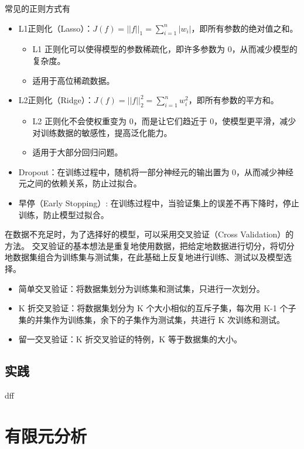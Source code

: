 \documentclass[12pt]{article}
\begin{document}
常见的正则方式有
\begin{itemize}
    \item L1正则化（Lasso）：$J(f) = ||f||_1 = \sum_{i=1}^{n} |w_i|$，即所有参数的绝对值之和。
        \begin{itemize}
            \item L1 正则化可以使得模型的参数稀疏化，即许多参数为 0，从而减少模型的复杂度。
            \item 适用于高位稀疏数据。
        \end{itemize}
    \item L2正则化（Ridge）：$J(f) = ||f||_2^2 = \sum_{i=1}^{n} w_i^2$，即所有参数的平方和。
        \begin{itemize}
            \item L2 正则化不会使权重变为 0，而是让它们趋近于 0，使模型更平滑，减少对训练数据的敏感性，提高泛化能力。
            \item 适用于大部分回归问题。
        \end{itemize}
    \item Dropout：在训练过程中，随机将一部分神经元的输出置为 0，从而减少神经元之间的依赖关系，防止过拟合。
    \item 早停（Early Stopping）: 在训练过程中，当验证集上的误差不再下降时，停止训练，防止模型过拟合。
\end{itemize}
在数据不充足时，为了选择好的模型，可以采用交叉验证（Cross Validation）的方法。
交叉验证的基本想法是重复地使用数据，把给定地数据进行切分，将切分地数据集组合为训练集与测试集，在此基础上反复地进行训练、测试以及模型选择。
\begin{itemize}
    \item 简单交叉验证：将数据集划分为训练集和测试集，只进行一次划分。
    \item K 折交叉验证：将数据集划分为 K 个大小相似的互斥子集，每次用 K-1 个子集的并集作为训练集，余下的子集作为测试集，共进行 K 次训练和测试。
    \item 留一交叉验证：K 折交叉验证的特例，K 等于数据集的大小。
\end{itemize}

\subsection{实践}
dff
\section{有限元分析}
\end{document}
